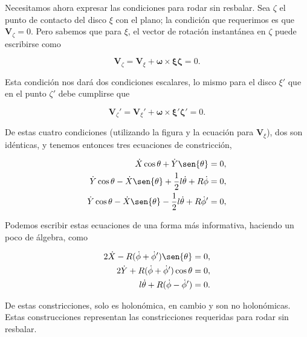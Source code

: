 \documentclass[a4paper,10pt]{article}
\numberwithin{equation}{section}
\begin{document}
Necesitamos ahora expresar las condiciones para rodar sin resbalar. Sea 
$\zeta$ el punto de contacto del disco $\xi$ con el plano; la condición que 
requerimos es que $\mathbf{V}_\zeta = 0$. Pero sabemos que para $\xi$, 
el vector de rotación instantánea en $\zeta$ puede escribirse como 

\begin{equation}
 \mathbf{V}_\zeta = \mathbf{V}_\xi + \mathbf{\omega}\times \mathbf{\xi\zeta} = 0.
\end{equation}

Esta condición nos dará dos condiciones escalares, lo mismo para 
el disco $\xi'$ que en el punto $\zeta'$ debe cumplirse que 

\begin{equation}
 \mathbf{V}_\zeta' = \mathbf{V}_\xi' + \mathbf{\omega}\times \mathbf{\xi'\zeta'} = 0.
\end{equation}

De estas cuatro condiciones (utilizando la figura  y la ecuación para $\mathbf{V}_\xi$), 
dos son idénticas, y tenemos entonces tres ecuaciones de constricción,

\begin{align}
\label{eq:discosConstri01}
 \dot{X}\cos{\theta} + \dot{Y}\sen{\theta} &= 0, \\
\label{eq:discosConstri02}
 \dot{Y}\cos{\theta} - \dot{X}\sen{\theta} + \frac{1}{2}l\dot{\theta} + R\dot{\phi} &= 0, \\
\label{eq:discosConstri03}
 \dot{Y}\cos{\theta} - \dot{X}\sen{\theta} - \frac{1}{2}l\dot{\theta} + R\dot{\phi}' &= 0,
\end{align}

Podemos escribir estas ecuaciones de una forma más informativa, haciendo 
un poco de álgebra, como

\begin{align}
\label{eq:discosConstri1}
 2\dot{X} - R (\dot{\phi} + \dot{\phi}')\sen{\theta} &= 0, \\
\label{eq:discosConstri2}
 2\dot{Y} + R (\dot{\phi} + \dot{\phi}')\cos{\theta} &= 0, \\
\label{eq:discosConstri3}
 l\dot{\theta} + R (\dot{\phi} - \dot{\phi}') &= 0.
\end{align}

De estas constricciones, solo  es holonómica, 
en cambio  y  son no holonómicas. 
Estas construcciones representan las constricciones requeridas para rodar 
sin resbalar. 
\end{document}
